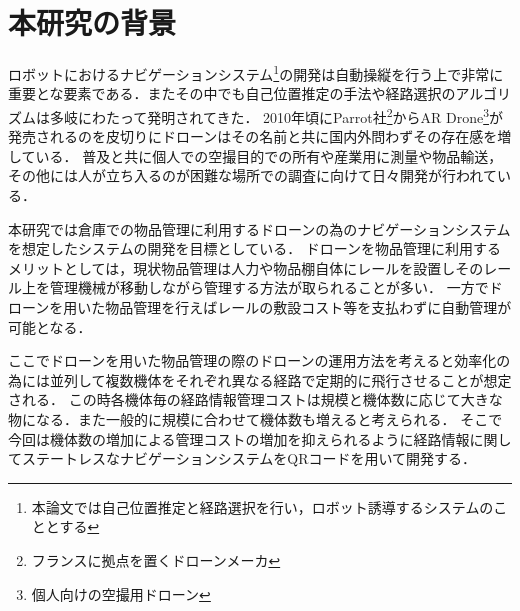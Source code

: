 \section{本研究の背景}
ロボットにおけるナビゲーションシステム\footnote{本論文では自己位置推定と経路選択を行い，ロボット誘導するシステムのこととする}の開発は自動操縦を行う上で非常に重要とな要素である．またその中でも自己位置推定の手法や経路選択のアルゴリズムは多岐にわたって発明されてきた．
2010年頃にParrot社\footnote{フランスに拠点を置くドローンメーカ}からAR Drone\footnote{個人向けの空撮用ドローン}が発売されるのを皮切りにドローンはその名前と共に国内外問わずその存在感を増している．
普及と共に個人での空撮目的での所有や産業用に測量や物品輸送，その他には人が立ち入るのが困難な場所での調査に向けて日々開発が行われている．

本研究では倉庫での物品管理に利用するドローンの為のナビゲーションシステムを想定したシステムの開発を目標としている．
ドローンを物品管理に利用するメリットとしては，現状物品管理は人力や物品棚自体にレールを設置しそのレール上を管理機械が移動しながら管理する方法が取られることが多い．
一方でドローンを用いた物品管理を行えばレールの敷設コスト等を支払わずに自動管理が可能となる．

ここでドローンを用いた物品管理の際のドローンの運用方法を考えると効率化の為には並列して複数機体をそれぞれ異なる経路で定期的に飛行させることが想定される．
この時各機体毎の経路情報管理コストは規模と機体数に応じて大きな物になる．また一般的に規模に合わせて機体数も増えると考えられる．
そこで今回は機体数の増加による管理コストの増加を抑えられるように経路情報に関してステートレスなナビゲーションシステムをQRコードを用いて開発する．